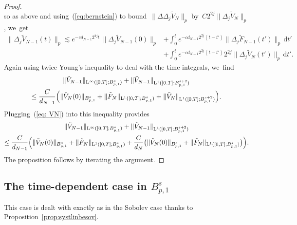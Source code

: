 \documentclass[JEP,XML,SOM,Unicode,published]{cedram}
\theoremstyle{definition}
\newcommand\dd{\mathrm{d}}
\renewcommand\L{\mathrm{L}}
\begin{document}
\begin{proof}
\[\]
so as above and using~(\ref{eq:bernstein}) to bound~$\|\Delta \Delta_j \tilde V_{N } \|_p$ by~$C 2^{2j}\| \Delta_j \tilde V_{N } \|_p$, we~get\vspace*{-3pt}
\[
\begin{aligned}
\| \Delta_j \tilde V_{N-1}(t)\|_p \lesssim e^{- cd_{N-1}2^{2j}t }\,\| \Delta_j \tilde V_{N-1}(0)\|_p & + \int_0^t e^{- cd_{N-1}2^{2j}(t-t') }\| \Delta_j\tilde F_{N-1}(t')\|_p \, \dd t' \\
& + \int_0^t e^{- cd_{N-1}2^{2j}(t-t') } 2^{2j}\| \Delta_j \tilde V_{N } (t')\|_p \,\dd t'.
\end{aligned}
\]
Again using twice Young's inequality to deal with the time integrals, we~find\vspace*{-3pt}
\begin{multline*}
\| \tilde V_{N-1 } \|_{\L^\infty([0,T];B^s_{p,1})} + \| \tilde V_{N-1 }\|_{\L^1([0,T];B^{s+2}_{p,1})} \\
\leq \frac C {d_{N-1}} \Bigl(\| \tilde V_N (0)\|_{B^s_{p,1}} + \| \tilde F_N \|_{\L^1([0,T];B^s_{p,1})}
+ \| \tilde V_{N } \|_{\L^1([0,T];B^{s+2}_{p,1})} \Bigr).
\end{multline*}
Plugging~(\ref{eq: VN}) into this inequality provides
\begin{multline*}
\| \tilde V_{N-1 } \|_{\L^\infty([0,T];B^s_{p,1})} + \| \tilde V_{N-1 }\|_{\L^1([0,T];B^{s+2}_{p,1})}\\
\leq \frac C {d_{N-1}} \Bigl(\| \tilde V_N (0)\|_{B^s_{p,1}} + \| \tilde F_N \|_{\L^1([0,T];B^s_{p,1})} + \frac C {d_N} \bigl(\| \tilde V_N (0)\|_{B^s_{p,1}} + \| \tilde F_N \|_{\L^1([0,T];B^s_{p,1})} \bigr) \Bigr).
\end{multline*}
The proposition follows by iterating the argument.
\end{proof}
\subsection{The time-dependent case in $B^s_{p,1}$}
This
case is dealt with exactly as in the Sobolev case thanks to Proposition~\ref{prop:systlinbesov}.

\end{document}
